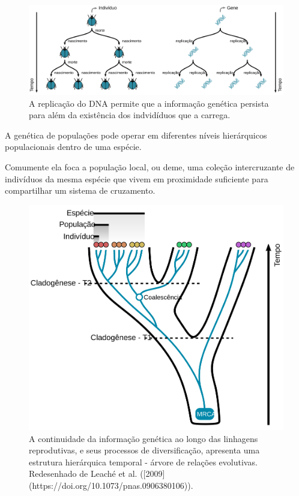 \documentclass[
]{book}
\begin{document}
\begin{figure}

{\centering \includegraphics[width=800px]{figs/nascimento_morte_replicacao} 

}

\caption{A replicação do DNA permite que a informação genética persista para além da existência dos indvidíduos que a carrega.}\label{fig:birthdeath}
\end{figure}

A genética de populações pode operar em diferentes níveis hierárquicos populacionais dentro de uma espécie.

Comumente ela foca a população local, ou deme, uma coleção intercruzante de indivíduos da mesma espécie que vivem em proximidade suficiente para compartilhar um sistema de cruzamento.

\begin{figure}

{\centering \includegraphics[width=500px]{figs/coalascencia} 

}

\caption{A continuidade da informação genética ao longo das linhagens reprodutivas, e seus processos de diversificação, apresenta uma estrutura hierárquica temporal - árvore de relações evolutivas. Redesenhado de Leaché et al. ([2009](https://doi.org/10.1073/pnas.0906380106)).}\label{fig:coalascencia}
\end{figure}
\end{document}
